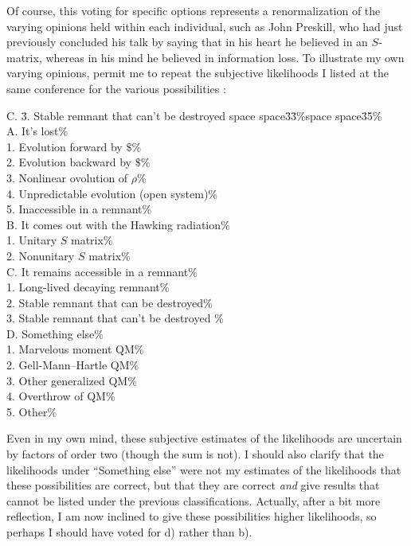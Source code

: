 \documentclass[12pt]{article}
\begin{document}
	Of course, this voting for specific options represents a
renormalization of
the varying opinions held within each individual, such as John
Preskill, who
had just previously concluded his talk \cite{PreSB} by saying that in
his
heart
he believed in an $S$-matrix, whereas in his mind he believed in
information
loss.  To illustrate my own varying opinions, permit me to repeat the
subjective
likelihoods I listed at the same conference for the various
possibilities
\cite{PagSB}:
\pagebreak
\begin{tabbing}
C. \= 3. Stable remnant that can't be destroyed space space\=
3\=3\%space space\=3\=5\%\kill
{}\hspace{25 mm}{\bf Personal
Estimate of
Likelihoods}\\
A. It's lost\>\%\+\\
 1. Evolution forward by $\$$\>\>\>\%\\
 2. Evolution backward by $\$$\>\>\>\%\\
 3. Nonlinear ovolution of $\rho$\>\>\>\%\\
 4. Unpredictable evolution (open system)\>\>\%\\
 5. Inaccessible in a remnant\>\>\>\%\-\\
 B. It comes out with the Hawking radiation\>\%\+\\
 1. Unitary $S$ matrix\>\>\%\\
 2. Nonunitary $S$ matrix\>\>\>\%\-\\
C. It remains accessible in a remnant\>\>\%\+\\
1. Long-lived decaying remnant\>\>\>\%\\
2. Stable remnant that can be destroyed\>\>\>\%\\
3. Stable remnant that can't be destroyed \>\>\>\%\-\\
D. Something else\>\%\+\\
1. Marvelous moment  QM\>\>\>\%\\
2. Gell-Mann--Hartle QM\>\>\>\%\\
3. Other generalized QM\>\>\%\\
4. Overthrow of QM\>\>\>\%\\
5. Other\>\>\>\%\\
\end{tabbing}

	Even in my own mind, these subjective estimates of the
likelihoods are
uncertain by factors of order two (though the sum is not).  I should
also
clarify
that the likelihoods under ``Something else'' were not my estimates
of the
likelihoods that these possibilities are correct, but that they are
correct
{\em and} give results that cannot be listed under the previous
classifications.
Actually, after a bit more reflection, I am now inclined to give
these
possibilities higher likelihoods, so perhaps I should have voted for
d) rather
than b).
\end{document}
